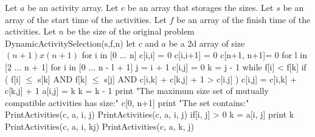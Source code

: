 \documentclass[11pt]{article}
\begin{document}
\begin{flushleft}
    Let $a$ be an activity array. \newline
    Let $c$ be an array that storages the sizes. \newline
    Let $s$ be an array of the start time of the activities. \newline
    Let $f$ be an array of the finish time of the activities. \newline
    Let $n$ be the size of the original problem \newline \newline
DynamicActivitySelection(s,f,n) \newline \null
    \quad let $c$ and $a$ be a 2d array of size $(n+1) x (n+1)$ \newline \null
    \quad for i in [0 ... n] \newline \null
        \quad \quad c[i,i] = 0 \newline \null
        \quad \quad c[i,i+1] = 0 \newline \null
    \quad c[n+1, n+1]= 0 \newline \null
    \quad for l in [2 ... n + 1] \newline \null
        \quad \quad for i in [0 ... n - l + 1] \newline \null
            \quad \quad \quad j = i + 1 \newline \null
            \quad \quad \quad c[i,j] = 0 \newline \null
            \quad \quad \quad k = j - 1 \newline \null
            \quad \quad \quad while f[i] < f[k] \newline \null
                \quad \quad \quad \quad  if (
                    f[i] $\leq$ s[k] AND 
                    f[k] $\leq$ s[j] AND
                    c[i,k] + c[k,j] + 1 > c[i.j]
                    ) \newline \null
                    \quad \quad \quad \quad \quad c[i,j] = c[i,k] + c[k,j] + 1 \newline \null
                    \quad \quad \quad \quad \quad a[i,j] = k \newline \null
                \quad \quad \quad \quad k = k - 1 \newline \null
    \quad print "The maximum size set of mutually compatible activities has size:" c[0, n+1] \newline \null
    \quad print "The set contains:" PrintActivities(c, a, i, j) \newline \null
PrintActivities(c, a, i, j) \newline \null
    \quad if[i, j] > 0 \newline \null
        \quad \quad k = a[i, j] \newline \null
        \quad \quad print k \newline \null
        \quad \quad PrintActivities(c, a, i, kj) \newline \null
        \quad \quad PrintActivities(c, a, k, j) \newline \null

\end{flushleft}
\end{document}
